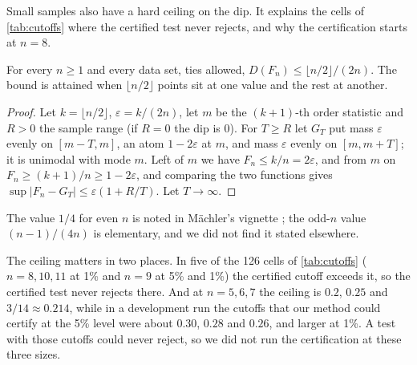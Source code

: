 Small samples also have a hard ceiling on the dip. It explains the cells of \cref{tab:cutoffs} where the certified test never rejects, and why the certification starts at $n=8$.

\begin{lemma}\label{lem:maxdip}
For every $n\ge1$ and every data set, ties allowed, $D(F_n)\le\lfloor n/2\rfloor/(2n)$. The bound is attained when $\lfloor n/2\rfloor$ points sit at one value and the rest at another.
\end{lemma}
\begin{proof}
Let $k=\lfloor n/2\rfloor$, $\varepsilon=k/(2n)$, let $m$ be the $(k+1)$-th order statistic and $R>0$ the sample range (if $R=0$ the dip is $0$). For $T\ge R$ let $G_T$ put mass $\varepsilon$ evenly on $[m-T,m]$, an atom $1-2\varepsilon$ at $m$, and mass $\varepsilon$ evenly on $[m,m+T]$; it is unimodal with mode $m$. Left of $m$ we have $F_n\le k/n=2\varepsilon$, and from $m$ on $F_n\ge(k+1)/n\ge1-2\varepsilon$, and comparing the two functions gives $\sup|F_n-G_T|\le\varepsilon(1+R/T)$. Let $T\to\infty$.
\end{proof}

The value $1/4$ for even $n$ is noted in Mächler's vignette \cite{Maechler}; the odd-$n$ value $(n-1)/(4n)$ is elementary, and we did not find it stated elsewhere.

The ceiling matters in two places. In five of the 126 cells of \cref{tab:cutoffs} ($n=8,10,11$ at 1\% and $n=9$ at 5\% and 1\%) the certified cutoff exceeds it, so the certified test never rejects there. And at $n=5,6,7$ the ceiling is $0.2$, $0.25$ and $3/14\approx0.214$, while in a development run the cutoffs that our method could certify at the 5\% level were about $0.30$, $0.28$ and $0.26$, and larger at 1\%. A test with those cutoffs could never reject, so we did not run the certification at these three sizes.
